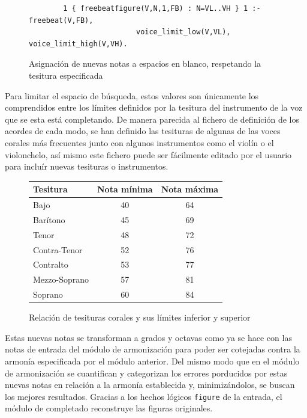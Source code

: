 \begin{figure}
	\centering
	\begin{verbatim}
		1 { freebeatfigure(V,N,1,FB) : N=VL..VH } 1 :- freebeat(V,FB),
		                 voice_limit_low(V,VL), voice_limit_high(V,VH).
	\end{verbatim}
	\label{fig:note-assig}
	\caption{Asignación de nuevas notas a espacios en blanco, respetando la tesitura especificada}
\end{figure}

Para limitar el espacio de búsqueda, estos valores son únicamente los comprendidos entre los límites definidos por la tesitura del instrumento de la voz que se esta está completando. De manera parecida al fichero de definición de los acordes de cada modo, se han definido las tesituras de algunas de las voces corales más frecuentes junto con algunos instrumentos como el violín o el violonchelo, así mismo este fichero puede ser fácilmente editado por el usuario para incluír nuevas tesituras o instrumentos.

\begin{figure}
	\centering
	\begin{tabular}{ | l | c | c | }
		\hline
		Tesitura & Nota mínima & Nota máxima \\ \hline \hline
		Bajo & 40 & 64 \\ \hline
		Barítono & 45 & 69 \\ \hline
		Tenor & 48 & 72 \\ \hline
		Contra-Tenor & 52 & 76 \\ \hline
		\hline
		Contralto & 53 & 77 \\ \hline
		Mezzo-Soprano & 57 & 81 \\ \hline
		Soprano & 60 & 84 \\ \hline
	\end{tabular}
	\label{fig:tesiturae}
	\caption{Relación de tesituras corales y sus límites inferior y superior}
\end{figure}

Estas nuevas notas se transforman a grados y octavas como ya se hace con las notas de entrada del módulo de armonización para poder ser cotejadas contra la armonía especificada por el módulo anterior. Del mismo modo que en el módulo de armonización se cuantifican y categorizan los errores porducidos por estas nuevas notas en relación a la armonía establecida y, minimizándolos, se buscan los mejores resultados. Gracias a los hechos lógicos \texttt{figure} de la entrada, el módulo de completado reconstruye las figuras originales.

